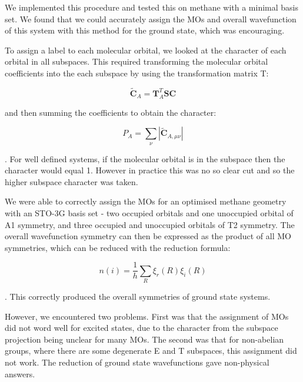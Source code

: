 We implemented this procedure and tested this on methane with a minimal basis set.
We found that we could accurately assign the MOs and overall wavefunction of this
system with this method for the ground state, which was encouraging.

To assign a label to each molecular orbital, we looked at the character of each
orbital in all subspaces. This required transforming the molecular orbital coefficients
into the each subspace by using the transformation matrix T:

\begin{equation}
\tilde{\mathbf{C}}_A = \mathbf{T}^T_A \mathbf{S} \mathbf{C}
\end{equation}

and then summing the coefficients to obtain the character:

\begin{equation}
P_A = \sum_{\nu} \left\lvert \tilde{\mathbf{C}}_{A, \mu\nu} \right\lvert  
\end{equation}

. For well defined systems, if the molecular orbital is in the subspace then the
character would equal 1. However in practice this was no so clear cut and so the
higher subspace character was taken.

We were able to correctly assign the MOs for an optimised methane geometry with
an STO-3G basis set - two occupied orbitals and one unoccupied orbital of A1 symmetry,
and three occupied and unoccupied orbitals of T2 symmetry. 
The overall wavefunction symmetry can then be expressed as the product of all MO
symmetries, which can be reduced with the reduction formula:

\begin{equation}
n\left( i \right) = \frac{1}{h} \sum_R \xi_r \left( R \right) \xi_i \left( R \right)
\end{equation}

. This correctly produced the overall symmetries of ground state systems.

However, we encountered two problems. First was that the assignment of MOs did not
word well for excited states, due to the character from the subspace projection
being unclear for many MOs. The second was that for non-abelian groups,
where there are some degenerate E and T subspaces, this assignment did not work.
The reduction of ground state wavefunctions gave non-physical answers.

